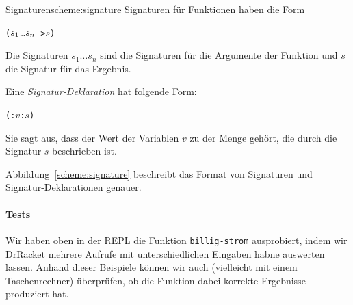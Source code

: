 \begin{feature}{Signaturen}{scheme:signature}
  Signaturen für Funktionen haben die Form
%
\begin{alltt}
(\(s\sb{1}\) \ldots \(s\sb{n}\) -> \(s\))
\end{alltt}
%
Die Signaturen $s_1 \ldots s_n$ sind die Signaturen für die Argumente
der Funktion und $s$ die Signatur für das Ergebnis.

Eine \textit{Signatur-Deklaration} hat
folgende Form:
%
\begin{alltt}
(: \(v\) : \(s\))
\end{alltt}
%
Sie sagt aus, dass der Wert der Variablen \(v\) zu der Menge gehört,
die durch die Signatur \(s\) beschrieben ist.
\end{feature}
%
Abbildung~\ref{scheme:signature} beschreibt das Format von Signaturen
und Signatur-Deklarationen genauer.

\paragraph{Tests} Wir haben oben in der REPL die Funktion
\texttt{billig-strom} ausprobiert, indem wir DrRacket mehrere Aufrufe
mit unterschiedlichen Eingaben habne auswerten lassen.  Anhand dieser
Beispiele können wir auch (vielleicht mit einem Taschenrechner)
überprüfen, ob die Funktion dabei korrekte Ergebnisse produziert hat.

